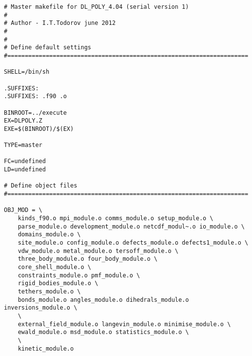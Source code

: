 \begin{verbatim}
# Master makefile for DL_POLY_4.04 (serial version 1)
#
# Author - I.T.Todorov june 2012
#
#
# Define default settings
#=====================================================================

SHELL=/bin/sh

.SUFFIXES:
.SUFFIXES: .f90 .o

BINROOT=../execute
EX=DLPOLY.Z
EXE=$(BINROOT)/$(EX)

TYPE=master

FC=undefined
LD=undefined

# Define object files
#=====================================================================

OBJ_MOD = \
	kinds_f90.o mpi_module.o comms_module.o setup_module.o \
	parse_module.o development_module.o netcdf_modul~.o io_module.o \
	domains_module.o \
	site_module.o config_module.o defects_module.o defects1_module.o \
	vdw_module.o metal_module.o tersoff_module.o \
	three_body_module.o four_body_module.o \
	core_shell_module.o \
	constraints_module.o pmf_module.o \
	rigid_bodies_module.o \
	tethers_module.o \
	bonds_module.o angles_module.o dihedrals_module.o inversions_module.o \
	\
	external_field_module.o langevin_module.o minimise_module.o \
	ewald_module.o msd_module.o statistics_module.o \
	\
	kinetic_module.o


\end{verbatim}
